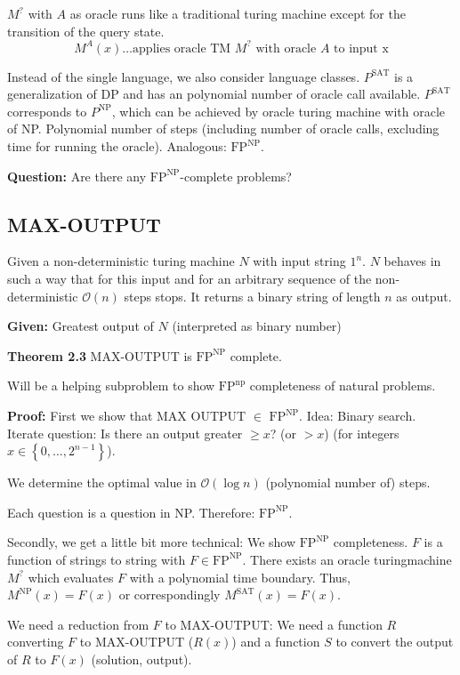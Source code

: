 \documentclass[a4paper]{article}
\newcommand{\cls}[1]{\rm{#1}}
\newcommand{\set}[1]{\left\{#1\right\}}
\begin{document}
$M^?$ with $A$ as oracle runs like a traditional turing machine except
for the transition of the query state.
\[
    M^A(x) \ldots \text{applies oracle TM $M^?$ with oracle $A$ to input x}
\]

Instead of the single language, we also consider language classes.
$P^{\text{SAT}}$ is a generalization of \cls{DP} and has an polynomial number
of oracle call available. $P^{\text{SAT}}$ corresponds to $P^{\text{NP}}$,
which can be achieved by oracle turing machine with oracle of \cls{NP}.
Polynomial number of steps (including number of oracle calls,
excluding time for running the oracle). Analogous: $\text{FP}^{\text{NP}}$.

\textbf{Question:}
  Are there any $\text{FP}^{\text{NP}}$-complete problems?

\subsection{MAX-OUTPUT}

Given a non-deterministic turing machine $N$ with input string $1^n$.
$N$ behaves in such a way that for this input and for an arbitrary
sequence of the non-deterministic $\mathcal{O}(n)$ steps stops.
It returns a binary string of length $n$ as output.

\textbf{Given:}
  Greatest output of $N$ (interpreted as binary number)

\textbf{Theorem 2.3}
  MAX-OUTPUT is $\text{FP}^{\text{NP}}$ complete.

Will be a helping subproblem to show $\text{FP}^{\text{np}}$ completeness
of natural problems.

\textbf{Proof:}
First we show that MAX OUTPUT $\in$ $\text{FP}^{\text{NP}}$.
Idea: Binary search.
Iterate question: Is there an output greater $\geq x$? (or $> x$)
(for integers $x \in \set{0,\ldots,2^{n-1}}$).

We determine the optimal value in $\mathcal{O}(\log{n})$
(polynomial number of) steps.

Each question is a question in \cls{NP}. Therefore: $\text{FP}^{\text{NP}}$.

Secondly, we get a little bit more technical:
We show $\text{FP}^{\text{NP}}$ completeness.
$F$ is a function of strings to string with $F \in \text{FP}^{\text{NP}}$.
There exists an oracle turingmachine $M^?$ which evaluates $F$ with a
polynomial time boundary. Thus, $M^{\text{NP}}(x) = F(x)$ or correspondingly
$M^{\text{SAT}}(x) = F(x)$.

We need a reduction from $F$ to MAX-OUTPUT:
We need a function $R$ converting $F$ to MAX-OUTPUT ($R(x)$) and a function
$S$ to convert the output of $R$ to $F(x)$ (solution, output).
\end{document}
